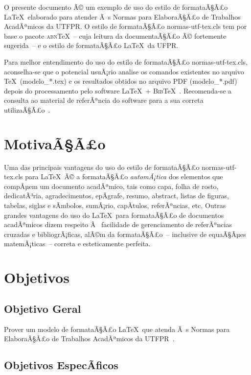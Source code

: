 \documentclass[openright]{normas-utf-tex} %
\begin{document}
O presente documento Ã© um exemplo de uso do estilo de formataÃ§Ã£o \LaTeX\ elaborado para atender Ã s Normas para ElaboraÃ§Ã£o de Trabalhos AcadÃªmicos da UTFPR. O estilo de formataÃ§Ã£o {\ttfamily normas-utf-tex.cls} tem por base o pacote \textsc{abn}\TeX~-- cuja leitura da documentaÃ§Ã£o \cite{abnTeX2009} Ã© fortemente sugerida~-- e o estilo de formataÃ§Ã£o \LaTeX\ da UFPR.

Para melhor entendimento do uso do estilo de formataÃ§Ã£o {\ttfamily normas-utf-tex.cls}, aconselha-se que o potencial usuÃ¡rio analise os comandos existentes no arquivo \TeX\ ({\ttfamily modelo\_*.tex}) e os resultados obtidos no arquivo PDF ({\ttfamily modelo\_*.pdf}) depois do processamento pelo software \LaTeX\ + \textsc{Bib}\TeX~\cite{LaTeX2009,BibTeX2009}. Recomenda-se a consulta ao material de referÃªncia do software para a sua correta utilizaÃ§Ã£o~\cite{Lamport1986,Buerger1989,Kopka2003,Mittelbach2004}.

\section{MotivaÃ§Ã£o}
\label{sec:motivacao}

Uma das principais vantagens do uso do estilo de formataÃ§Ã£o {\ttfamily normas-utf-tex.cls} para \LaTeX\ Ã© a formataÃ§Ã£o \textit{automÃ¡tica} dos elementos que compÃµem um documento acadÃªmico, tais como capa, folha de rosto, dedicatÃ³ria, agradecimentos, epÃ­grafe, resumo, abstract, listas de figuras, tabelas, siglas e sÃ­mbolos, sumÃ¡rio, capÃ­tulos, referÃªncias, etc. Outras grandes vantagens do uso do \LaTeX\ para formataÃ§Ã£o de documentos acadÃªmicos dizem respeito Ã  facilidade de gerenciamento de referÃªncias cruzadas e bibliogrÃ¡ficas, alÃ©m da formataÃ§Ã£o~-- inclusive de equaÃ§Ãµes  matemÃ¡ticas~-- correta e esteticamente perfeita.

\section{Objetivos}
\label{sec:objetivos}

\subsection{Objetivo Geral}
\label{subsec:objetivoGeral}

Prover um modelo de formataÃ§Ã£o \LaTeX\ que atenda Ã s Normas para ElaboraÃ§Ã£o de Trabalhos AcadÃªmicos da UTFPR~\cite{UTFPR2008}.

\subsection{Objetivos EspecÃ­ficos}
\label{subsec:objetivosEspecificos}
\end{document}
